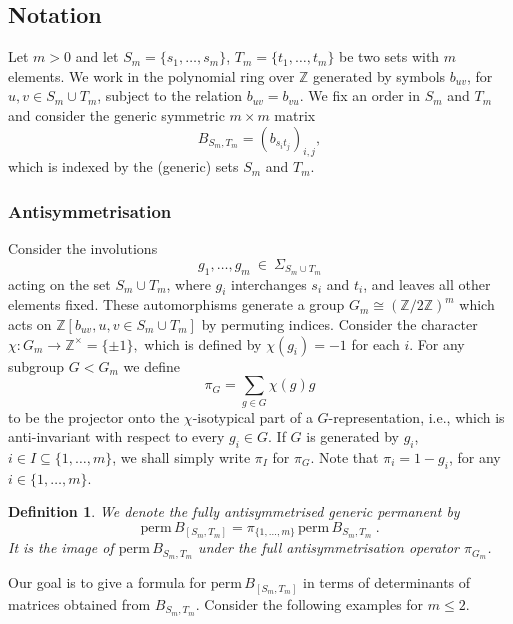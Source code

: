 \documentclass[10pt]{amsart}
\newcommand{\ZZ}{{\mathbb Z}}
\newcommand{\perm}{\mathrm{perm}\,}
\theoremstyle{plain}
\newtheorem{defn}[thm]{Definition}
\newcommand{\0}{\color{blue}{\mathsf{0}}}
\begin{document}
\subsection{Notation}
Let  $m>0$  and let 
$S_m = \{s_1,\ldots, s_m\}$, $T_m = \{t_1,\ldots, t_m\}$
be two sets with $m$ elements. 
We work in the polynomial ring over $\ZZ$ generated by symbols $b_{uv}$, for   $u,v \in S_m \cup T_m$, subject to the relation $b_{uv} = b_{vu}$.  
We fix an order in $S_m$ and $T_m$ and consider the generic symmetric $m \times m$ matrix
\[  B_{S_m,T_m}  =  (b_{s_it_j})_{i,j}, \] 
which is indexed by the (generic) sets $S_m$ and $T_m$.

\subsubsection{Antisymmetrisation}
Consider the involutions 
$$g_1,\ldots, g_m   \ \in \  \Sigma_{S_m \cup T_m}$$
acting on the set $S_m \cup T_m$, where $g_i$ interchanges $s_i$ and $t_i$, and leaves all other elements fixed.  These automorphisms generate a group 
$G_m \cong \left( \ZZ/2\ZZ\right)^m$
which acts on $\ZZ[b_{uv}, u,v \in S_m \cup T_m]$ by permuting indices. Consider the character
$ \chi : G_m  \rightarrow  \ZZ^{\times} = \{\pm 1\},$  
which is defined by  
$\chi( g_i) =  -1$ for each $i$. 
For any subgroup $G<G_m$ we define 
\[ \pi_{G} = \sum_{g\in G} \chi(g) g \]
to be the projector onto the $\chi$-isotypical part of a $G$-representation, i.e.,  which is anti-invariant with respect to every $g_i\in G$.  
If $G$ is generated by $g_i$, $i\in I\subseteq\{1,\ldots,m\}$,
we shall simply write $\pi_I$ for $\pi_G$. Note that 
$\pi_i = 1-g_i$, 
for  any $i\in\{1,\ldots,m\}$. 

\begin{defn} We denote the fully antisymmetrised  generic permanent by
\begin{equation} \perm B_{[S_m,T_m]}  =  \pi_{\{1,\ldots,m\}}\, \perm B_{S_m,T_m} \ .
\end{equation}
It is the image of $\perm B_{S_m,T_m}$ under the full antisymmetrisation operator $\pi_{G_m}$.
\end{defn}

Our goal is to give a formula for $\perm B_{[S_m,T_m]}$ in terms of determinants of matrices obtained from $B_{S_m,T_m}.$  Consider the following examples for $m\leq 2$.
\end{document}
